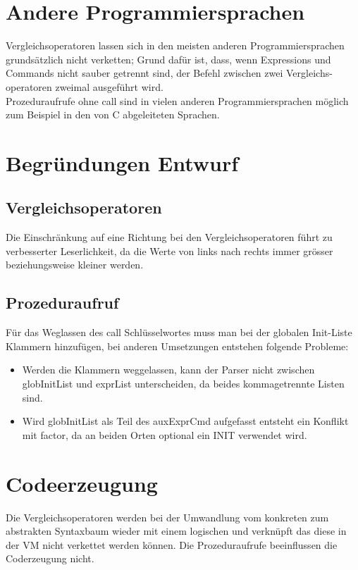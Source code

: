 \documentclass[a4paper,10pt]{article}
\begin{document}
\section{Andere Programmiersprachen}
Vergleichsoperatoren lassen sich in den meisten anderen Programmiersprachen grunds\"atzlich nicht verketten; Grund daf\"ur ist, dass, wenn Expressions und Commands nicht sauber getrennt sind, der Befehl zwischen zwei Vergleichs-operatoren zweimal ausgef\"uhrt wird.\\
Prozeduraufrufe ohne call sind in vielen anderen Programmiersprachen
m\"oglich zum Beispiel in den von C abgeleiteten Sprachen.
\section{Begr\"undungen Entwurf}
\subsection{Vergleichsoperatoren}
Die Einschr\"ankung auf eine Richtung bei den Vergleichsoperatoren
f\"uhrt zu verbesserter Leserlichkeit, da die Werte von links nach 
rechts immer gr\"osser beziehungsweise kleiner werden.
\subsection{Prozeduraufruf}
F\"ur das Weglassen des call Schl\"usselwortes muss man bei der 
globalen Init-Liste Klammern hinzuf\"ugen, bei anderen Umsetzungen 
entstehen folgende Probleme:\\
\begin{itemize}
\item Werden die Klammern weggelassen, kann der Parser nicht zwischen
globInitList und exprList unterscheiden, da beides kommagetrennte
Listen sind.
\item Wird globInitList als Teil des auxExprCmd aufgefasst entsteht
ein Konflikt mit factor, da an beiden Orten optional ein INIT
verwendet wird.
\end{itemize}
\section{Codeerzeugung}
Die Vergleichsoperatoren werden bei der Umwandlung vom konkreten zum abstrakten Syntaxbaum wieder mit einem logischen und verkn\"upft das diese in der VM nicht verkettet werden k\"onnen.
Die Prozeduraufrufe beeinflussen die Coderzeugung nicht.
\end{document}
